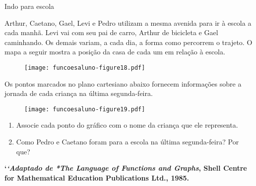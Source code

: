 \documentclass[extrafontsizes, twoside, 11pt, openright, final]{memoir}
\begin{document}
\begin{task}{Indo para escola}
	\label{\detokenize{AF106-5:ativ-indo-para-escola}}\label{\detokenize{AF106-5:atividade-indo-para-escola}}

	Arthur, Caetano, Gael, Levi e Pedro utilizam a mesma avenida para ir à escola a cada manhã. Levi vai com seu pai de carro, Arthur de bicicleta e Gael caminhando. Os demais variam, a cada dia, a forma como percorrem o trajeto. O mapa a seguir mostra a posição da casa de cada um em relação à escola.
	\label{\detokenize{AF106-5:fig-mapa-escola}}

	\begin{figure}[H]
		\begin{center}
			\centering

			\texttt{[image: funcoesaluno-figure18.pdf]}
		\end{center}
	\end{figure}

	Os pontos marcados no plano cartesiano abaixo fornecem informações sobre a jornada de cada criança na última segunda-feira.
	\label{\detokenize{AF106-5:fig-grafico-jornada}}

	\begin{figure}[H]
		\begin{center}
			\centering

			\texttt{[image: funcoesaluno-figure19.pdf]}
		\end{center}
	\end{figure}

	\begin{enumerate}
		\item Associe cada ponto do gráfico com o nome da criança que ele representa.

		\item Como Pedro e Caetano foram para a escola na última segunda-feira? Por que?

	\end{enumerate}

	{\color{red}\bfseries{}{}`\emph{{}`Adaptado de *The Language of Functions and Graphs}, Shell Centre for Mathematical Education Publications Ltd., 1985.}

\end{task}
\end{document}
